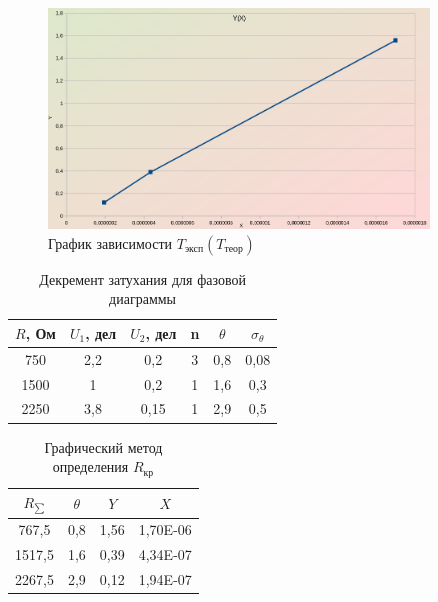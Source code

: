 \documentclass[a4paper, 12pt]{article}%
\begin{document}
\begin{figure}[h!]
\begin{center}
\includegraphics[width = 0.9\textwidth]{graph3.jpg}
\caption{График зависимости $T_{\text{эксп}}(T_{\text{теор}})$}
\end{center}
\end{figure}

\begin{table}[h!]
\begin{center}
\begin{tabular}{|c|c|c|c|c|c|}
\hline
$R$, Ом & $U_1$, дел & $U_2$, дел & n & $\theta$ & $\sigma_{\theta}$ \\ \hline
750  & 2,2  & 0,2        & 3 & 0,8    & 0,08              \\ \hline
1500 & 1    & 0,2        & 1 & 1,6    & 0,3              \\ \hline
2250 & 3,8    & 0,15     & 1 & 2,9    & 0,5              \\ \hline
\end{tabular}
\caption{Декремент затухания для фазовой диаграммы}
\end{center}
\end{table}

\begin{table}[h!]
\begin{center}
\begin{tabular}{|c|c|c|c|}
\hline
\textbf{$R_{\sum}$} & \textbf{$\theta$} & \textbf{$Y$} & \textbf{$X$} \\ \hline
767,5                 & 0,8      & 1,56     & 1,70E-06 \\ \hline
1517,5                & 1,6      & 0,39     & 4,34E-07 \\ \hline
2267,5                & 2,9      & 0,12     & 1,94E-07 \\ \hline
\end{tabular}
\caption{Графический метод определения $R_{\text{кр}}$}
\end{center}
\end{table}
\end{document}
